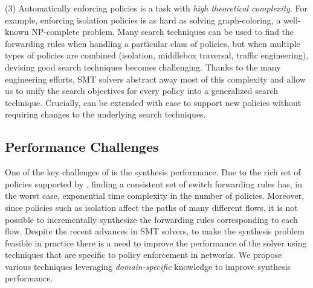 (3) Automatically enforcing policies is a task with
\emph{high theoretical complexity}. 
For example, enforcing isolation policies
is as hard as solving
graph-coloring, a well-known
NP-complete problem.
Many search techniques can be used to find the forwarding rules when
handling a particular class of policies, but when multiple types of
policies are combined (isolation, middlebox traversal, traffic
engineering), devising good search techniques becomes challenging.
Thanks to the many engineering efforts, SMT solvers abstract away most
of this complexity and allow us to unify the search objectives for
every policy into a generalized search technique.
Crucially, \Name can be extended with ease to
support new policies without requiring changes to the underlying search
techniques.

\subsection{Performance Challenges} \label{sec:performance}

One of the key challenges of \Name is the synthesis
performance. 
Due to the rich set of policies supported by \Name,
finding a consistent set of switch forwarding rules 
has, in the worst case, exponential time complexity in
the number of policies.
Moreover, since policies such as isolation affect
the paths of many different flows, it is not possible to incrementally synthesize
the forwarding rules corresponding to each flow. 
Despite the recent advances in SMT solvers, to make
the synthesis problem feasible in practice
there is a need to improve the performance of the solver
using techniques that are specific to policy enforcement in networks.
We propose various techniques leveraging
\emph{domain-specific} knowledge to improve synthesis performance. 

